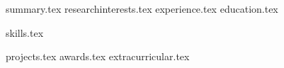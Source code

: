 \documentclass[a4paper,12pt]{article}
\begin{document}
\pagecolor{Background}


{summary.tex}
{researchinterests.tex}
{experience.tex}
{education.tex}

\pagebreak
\begin{multicols}{2}
{skills.tex}
\end{multicols}
{projects.tex}
{awards.tex}
{extracurricular.tex}
\end{document}
